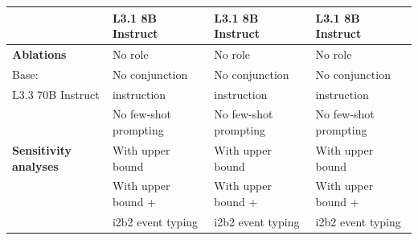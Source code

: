 \begin{table}[tb!]
\begin{adjustbox}{width=0.8\textwidth}
\begin{tabular}{|p{3.5cm}|p{3.5cm}|p{3.5cm}|p{3.5cm}|}
                                & L3.1 8B Instruct             & L3.1 8B Instruct                & L3.1 8B Instruct                  \\ \hline
\parbox{3cm}{\textbf{Ablations}} & No role                  & No role                  & No role                   \\ 
Base: & No conjunction & No conjunction & No conjunction
                                \\ 
L3.3 70B Instruct                        & \quad instruction &  \quad instruction & \quad instruction \\
                                
                                & No few-shot prompting    & No few-shot prompting    & No few-shot prompting     \\ \hline
\textbf{Sensitivity analyses}   & With upper bound         & With upper bound         & With upper bound          \\ 
                                & With upper bound + 
                                                         & With upper bound +  
                                                                                      & With upper bound + \\
                                & \quad i2b2 event typing & \quad i2b2 event typing & \quad i2b2 event typing \\
                                                                                      \hline
\end{tabular}
\end{adjustbox}
\end{table}